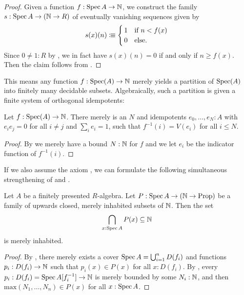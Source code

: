 \begin{proof}
  Given a function $f : \operatorname{Spec} A \to \mathbb{N}$,
  we construct the family $s : \operatorname{Spec} A \to (\mathbb{N} \to R)$
  of eventually vanishing sequences
  given by
  \[
    s(x)(n) \colonequiv
    \begin{cases}
      \,1 &\text{if $n < f(x)$}\\
      \,0 &\text{else} \rlap{.}
    \end{cases}
  \]
  Since $0 \neq 1 : R$ by ,
  we in fact have $s(x)(n) = 0$ if and only if $n \geq f(x)$.
  Then the claim follows from .
\end{proof}

This means any function $f:\operatorname{Spec}(A)\to \mathbb{N}$ merely yields a partition of $\operatorname{Spec}(A)$ into finitely many decidable subsets.
Algebraically, such a partition is given a finite system of orthogonal idempotents:

\begin{corollary}%
  Let $f:\operatorname{Spec}(A)\to\mathbb{N}$.
  There merely is an $N$ and idempotents $e_0,\dots,e_N:A$ with $e_ie_j=0$ for all $i\neq j$ and $\sum_ie_i=1$,
  such that $f^{-1}(i)=V(e_i)$ for all $i\leq N$.
\end{corollary}

\begin{proof}
  By  we merely have a bound $N:\mathbb{N}$ for $f$ and we let $e_i$ be the indicator function of $f^{-1}(i)$.
\end{proof}

If we also assume the axiom ,
we can formulate the following simultaneous strengthening
of 
and .

\begin{proposition}%
  \label{strengthened-boundedness}
  Let $A$ be a finitely presented $R$-algebra.
  Let $P : \operatorname{Spec} A \to (\mathbb{N} \to \mathrm{Prop})$
  be a family of upwards closed, merely inhabited subsets of $\mathbb{N}$.
  Then the set
  \[ \bigcap_{x : \operatorname{Spec} A} P(x) \subseteq \mathbb{N} \]
  is merely inhabited.
\end{proposition}

\begin{proof}
  By ,
  there merely exists a cover
  $\operatorname{Spec} A = \bigcup_{i = 1}^n D(f_i)$
  and functions $p_i : D(f_i) \to \mathbb{N}$
  such that $p_i(x) \in P(x)$ for all $x : D(f_i)$.
  By ,
  every $p_i : D(f_i) = \operatorname{Spec} A[f_i^{-1}] \to \mathbb{N}$
  is merely bounded by some $N_i : \mathbb{N}$,
  and then $\mathrm{max}(N_1, \dots, N_n) \in P(x)$ for all $x : \operatorname{Spec} A$.
\end{proof}
